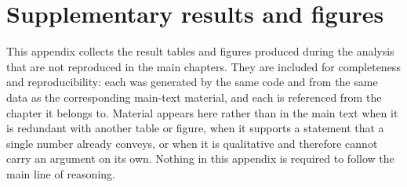 %
%
%
%
\chapter{Supplementary results and figures}
\label{app:figures}

This appendix collects the result tables and figures produced during the
analysis that are not reproduced in the main chapters. They are included for
completeness and reproducibility: each was generated by the same code and from
the same data as the corresponding main-text material, and each is referenced
from the chapter it belongs to. Material appears here rather than in the main
text when it is redundant with another table or figure, when it supports a
statement that a single number already conveys, or when it is qualitative and
therefore cannot carry an argument on its own. Nothing in this appendix is
required to follow the main line of reasoning.


